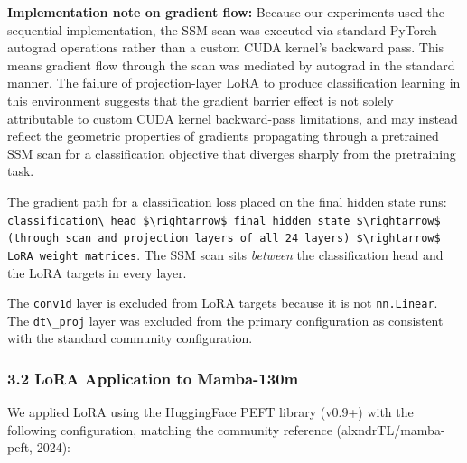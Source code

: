 \textbf{Implementation note on gradient flow:} Because our experiments used the sequential implementation, the SSM scan was executed via standard PyTorch autograd operations rather than a custom CUDA kernel's backward pass. This means gradient flow through the scan was mediated by autograd in the standard manner. The failure of projection-layer LoRA to produce classification learning in this environment suggests that the gradient barrier effect is not solely attributable to custom CUDA kernel backward-pass limitations, and may instead reflect the geometric properties of gradients propagating through a pretrained SSM scan for a classification objective that diverges sharply from the pretraining task.

The gradient path for a classification loss placed on the final hidden state runs: \texttt{classification\textbackslash \_head \$\textbackslash rightarrow\$ final hidden state \$\textbackslash rightarrow\$ (through scan and projection layers of all 24 layers) \$\textbackslash rightarrow\$ LoRA weight matrices}. The SSM scan sits \textit{between} the classification head and the LoRA targets in every layer.

The \texttt{conv1d} layer is excluded from LoRA targets because it is not \texttt{nn.Linear}. The \texttt{dt\textbackslash \_proj} layer was excluded from the primary configuration as consistent with the standard community configuration.

\subsubsection{3.2 LoRA Application to Mamba-130m}

We applied LoRA using the HuggingFace PEFT library (v0.9+) with the following configuration, matching the community reference (alxndrTL/mamba-peft, 2024):

\begin{table}[htbp]
\centering
{}
\end{table}

